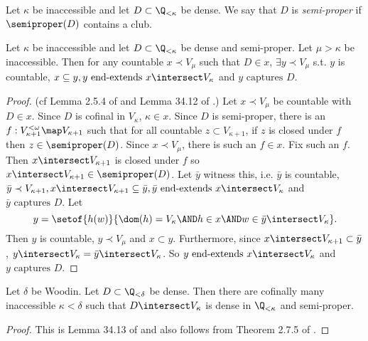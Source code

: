 \documentclass[oneside,12pt]{amsart}
\begin{document}
\begin{definition}
Let $\kappa$ be inaccessible and let $D\subset\Q_{<\kappa}$ be dense. We say that $D$ is \emph{semi-proper}
if $\semiproper(D)$ contains a club.
\end{definition}

\begin{lemma}
\label{SemiProperEquivalence}
Let $\kappa$ be inaccessible and let $D\subset\Q_{<\kappa}$ be dense and semi-proper. 
Let $\mu>\kappa$ be inaccessible.
Then for any countable $x\prec V_{\mu}$ such that $D\in x$, $\exists y \prec V_{\mu}$
s.t. $y$ is countable, $x\subseteq y, y \text{ end-extends } x \intersect V_{\kappa}$ and $ y \text{ captures } D$.
\end{lemma}
\begin{proof}
(cf Lemma 2.5.4 of \cite{Larson_Book} and Lemma 34.12 of \cite{Jech_Book2}.)
Let $x\prec V_{\mu}$ be countable with $D\in x$. Since $D$ is cofinal in $V_{\kappa}$, $\kappa\in x$.
Since $D$ is semi-proper,
there is an $f:V_{\kappa+1}^{<\omega}\map V_{\kappa+1}$ such that for all countable $z\subset V_{\kappa+1}$,
if $z$ is closed under $f$ then $z\in\semiproper(D)$. Since $x\prec V_{\mu}$, there is such an $f\in x$. Fix such an $f$.
Then $x\intersect V_{\kappa+1}$ is closed under $f$ so $x\intersect V_{\kappa+1} \in \semiproper(D)$. Let $\bar{y}$ witness this,
i.e. $\bar{y}$ is countable, $\bar{y}\prec V_{\kappa+1}, x\intersect V_{\kappa+1}\subseteq \bar{y}, \bar{y} \text{ end-extends } x \intersect V_{\kappa}$ and $\bar{y} \text{ captures } D$.
Let
$$y=\setof{h(w)}{\dom(h)=V_{\kappa} \AND h\in x \AND w\in \bar{y}\intersect V_{\kappa}}.$$
Then $y$ is countable,  $y \prec V_{\mu}$ and  $x\subset y$. Furthermore, since 
$x\intersect V_{\kappa+1} \subset \bar{y}$, $y\intersect V_{\kappa} = \bar{y} \intersect V_{\kappa}$.
So $y \text{ end-extends } x \intersect V_{\kappa}$ and $ y \text{ captures } D$.
\end{proof}

\begin{lemma}
\label{WoodinGivesSemiProper}
Let $\delta$ be Woodin. Let $D\subset \Q_{<\delta}$ be dense. Then there are cofinally many inaccessible $\kappa<\delta$ such
that $D\intersect V_{\kappa}$ is dense in $\Q_{<\kappa}$ and semi-proper.
\end{lemma}
\begin{proof}
This is Lemma 34.13 of \cite{Jech_Book2} and also follows from Theorem 2.7.5 of \cite{Larson_Book}.
\end{proof}
\end{document}
